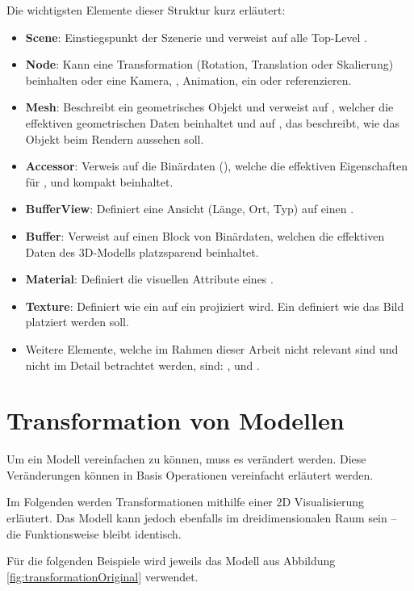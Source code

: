 Die wichtigsten Elemente dieser Struktur kurz erläutert:
\begin{itemize}
  \item \textbf{Scene}: Einstiegspunkt der Szenerie und verweist auf alle Top-Level .
  \item \textbf{Node}: Kann eine Transformation (Rotation, Translation oder Skalierung) beinhalten oder eine Kamera, , Animation, ein  oder  referenzieren.
  \item  \textbf{Mesh}: Beschreibt ein geometrisches Objekt und verweist auf , welcher die effektiven geometrischen Daten beinhaltet und auf , das beschreibt, wie das Objekt beim Rendern aussehen soll.
  \item \textbf{Accessor}: Verweis auf die Binärdaten (), welche die effektiven Eigenschaften für ,  und  kompakt beinhaltet.
  \item \textbf{BufferView}: Definiert eine Ansicht (Länge, Ort, Typ) auf einen .
  \item \textbf{Buffer}: Verweist auf einen Block von Binärdaten, welchen die effektiven Daten des 3D-Modells platzsparend beinhaltet.
  \item \textbf{Material}: Definiert die visuellen Attribute eines .
  \item \textbf{Texture}: Definiert wie ein  auf ein  projiziert wird. Ein  definiert wie das Bild platziert werden soll.
  \item Weitere Elemente, welche im Rahmen dieser Arbeit nicht relevant sind und nicht im Detail betrachtet werden, sind: ,  und .
\end{itemize}

\section{Transformation von Modellen}

Um ein Modell vereinfachen zu können, muss es verändert werden.
Diese Veränderungen können in Basis Operationen vereinfacht erläutert werden.

Im Folgenden werden Transformationen mithilfe einer 2D Visualisierung erläutert. Das Modell kann jedoch ebenfalls im dreidimensionalen Raum sein – die Funktionsweise bleibt identisch.

Für die folgenden Beispiele wird jeweils das Modell aus Abbildung \ref{fig:transformationOriginal} verwendet.

